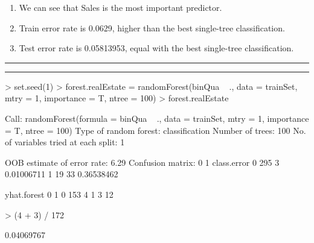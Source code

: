 \documentclass[a4paper]{article}
\newcommand{\question}[2] {\vspace{.25in} \hrule\vspace{0.5em}
\noindent{\bf #1: #2} \vspace{0.5em}
\hrule \vspace{.10in}}
\begin{document}
{\color{red}
\begin{enumerate}
\item We can see that Sales is the most important predictor.
\item Train error rate is 0.0629, higher than the best single-tree classification.
\item Test error rate is 0.05813953, equal with the best single-tree classification.
\end{enumerate}
}



\newpage
\question{3}{RandomForest}

\begin{Schunk}
\begin{Sinput}
> set.seed(1)
> forest.realEstate = randomForest(binQua ~ ., data = trainSet, mtry = 1, importance = T, ntree = 100)
> forest.realEstate
\end{Sinput}
\begin{Soutput}
Call:
 randomForest(formula = binQua ~ ., data = trainSet, mtry = 1,      importance = T, ntree = 100) 
               Type of random forest: classification
                     Number of trees: 100
No. of variables tried at each split: 1

        OOB estimate of  error rate: 6.29%
Confusion matrix:
    0  1 class.error
0 295  3  0.01006711
1  19 33  0.36538462
\end{Soutput}
\begin{Soutput}
yhat.forest   0   1
          0 153   4
          1   3  12
\end{Soutput}
\begin{Sinput}
> (4 + 3) / 172
\end{Sinput}
\begin{Soutput}
[1] 0.04069767
\end{Soutput}
\end{Schunk}
\end{document}
